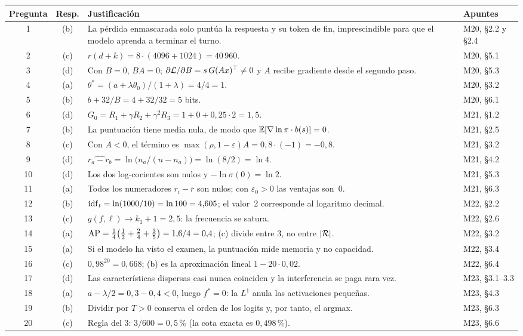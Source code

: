 \begin{center}
\small
\renewcommand{\arraystretch}{1.12}
\begin{tabularx}{\textwidth}{@{}c c >{\raggedright\arraybackslash}X >{\raggedright\arraybackslash}p{2.5cm}@{}}
\toprule
Pregunta & Resp. & Justificación & Apuntes \\
\midrule
1 & (b) & La pérdida enmascarada solo puntúa la respuesta y su token de fin, imprescindible para que el modelo aprenda a terminar el turno. & M20, §2.2 y §2.4 \\
2 & (c) & $r(d+k)=8\cdot(4096+1024)=40\,960$. & M20, §5.1 \\
3 & (d) & Con $B=0$, $BA=0$; $\partial\mathcal{L}/\partial B=s\,G(Ax)^{\top}\ne 0$ y $A$ recibe gradiente desde el segundo paso. & M20, §5.3 \\
4 & (a) & $\theta^{\ast}=(a+\lambda\theta_0)/(1+\lambda)=4/4=1$. & M20, §3.2 \\
5 & (b) & $b+32/B=4+32/32=5$ bits. & M20, §6.1 \\
6 & (d) & $G_0=R_1+\gamma R_2+\gamma^{2}R_3=1+0+0{,}25\cdot 2=1{,}5$. & M21, §1.2 \\
7 & (b) & La puntuación tiene media nula, de modo que $\mathbb{E}[\nabla\ln\pi\cdot b(s)]=0$. & M21, §2.5 \\
8 & (c) & Con $A<0$, el término es $\max(\rho,1-\varepsilon)A=0{,}8\cdot(-1)=-0{,}8$. & M21, §3.2 \\
9 & (d) & $\widehat{r_a-r_b}=\ln\bigl(n_a/(n-n_a)\bigr)=\ln(8/2)=\ln 4$. & M21, §4.2 \\
10 & (d) & Los dos log-cocientes son nulos y $-\ln\sigma(0)=\ln 2$. & M21, §5.3 \\
11 & (a) & Todos los numeradores $r_i-\bar r$ son nulos; con $\varepsilon_0>0$ las ventajas son~0. & M21, §6.3 \\
12 & (b) & $\operatorname{idf}_t=\ln(1000/10)=\ln 100=4{,}605$; el valor~2 corresponde al logaritmo decimal. & M22, §2.2 \\
13 & (c) & $g(f,\ell)\to k_1+1=2{,}5$: la frecuencia se satura. & M22, §2.6 \\
14 & (a) & $\operatorname{AP}=\frac14\bigl(\frac12+\frac24+\frac35\bigr)=1{,}6/4=0{,}4$; (c) divide entre 3, no entre $\lvert\mathcal{R}\rvert$. & M22, §3.2 \\
15 & (a) & Si el modelo ha visto el examen, la puntuación mide memoria y no capacidad. & M22, §3.4 \\
16 & (c) & $0{,}98^{20}=0{,}668$; (b) es la aproximación lineal $1-20\cdot 0{,}02$. & M22, §6.4 \\
17 & (d) & Las características dispersas casi nunca coinciden y la interferencia se paga rara vez. & M23, §3.1--3.3 \\
18 & (a) & $a-\lambda/2=0{,}3-0{,}4<0$, luego $f^{\ast}=0$: la $L^{1}$ anula las activaciones pequeñas. & M23, §4.3 \\
19 & (b) & Dividir por $T>0$ conserva el orden de los logits y, por tanto, el argmax. & M23, §6.3 \\
20 & (c) & Regla del 3: $3/600=0{,}5\,\%$ (la cota exacta es $0{,}498\,\%$). & M23, §6.6 \\
\bottomrule
\end{tabularx}
\end{center}


